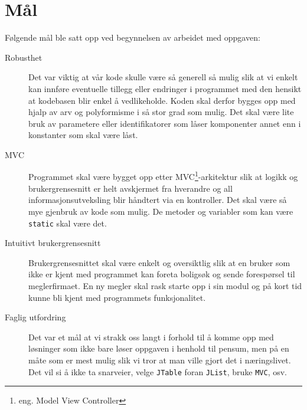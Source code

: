 \section{Mål}
Følgende mål ble satt opp ved begynnelsen av arbeidet med oppgaven:
\begin{description}
\item[Robusthet]
Det var viktig at vår kode skulle være så generell så mulig slik at vi enkelt kan innføre eventuelle tillegg eller endringer i programmet med den hensikt at kodebasen blir enkel å vedlikeholde. Koden skal derfor bygges opp med hjalp av arv og polyformisme i så stor grad som mulig. Det skal være lite bruk av parametere eller identifikatorer som låser komponenter annet enn i konstanter som skal være låst.
\item[MVC]
Programmet skal være bygget opp etter MVC\footnote{eng. Model View Controller}-arkitektur slik at logikk og brukergrensesnitt er helt avskjermet fra hverandre og all informasjonsutveksling blir håndtert via en kontroller. Det skal være så mye gjenbruk av kode som mulig. De metoder og variabler som kan være \texttt{static} skal være det.
\item[Intuitivt brukergrensesnitt]
Brukergrensesnittet skal være enkelt og oversiktlig slik at en bruker som ikke er kjent med programmet kan foreta boligsøk og sende forespørsel til meglerfirmaet. En ny megler skal rask starte opp i sin modul og på kort tid kunne bli kjent med programmets funksjonalitet.
\item[Faglig utfordring]
Det var et mål at vi strakk oss langt i forhold til å komme opp med løsninger som ikke bare løser oppgaven i henhold til pensum, men på en måte som er mest mulig slik vi tror at man ville gjort det i næringslivet. Det vil si å ikke ta snarveier, velge \texttt{JTable} foran \texttt{JList}, bruke \texttt{MVC}, osv.
\end{description}
